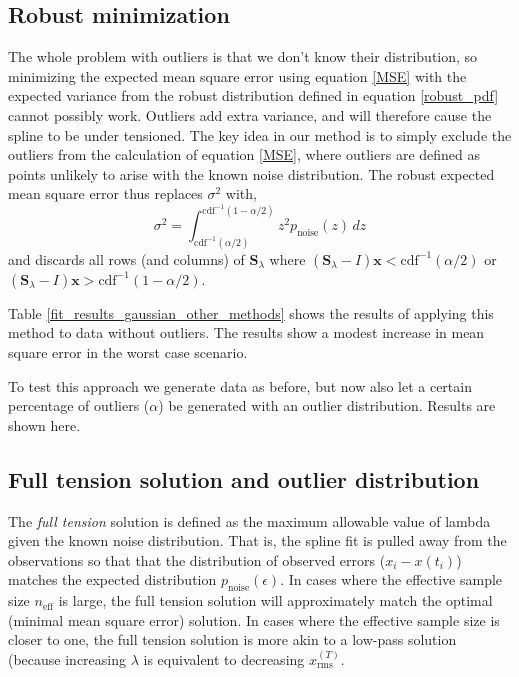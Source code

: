 \documentclass[10pt,journal]{IEEEtran}
\begin{document}
\subsection{Robust minimization}
\label{sec:robust_minimization}

The whole problem with outliers is that we don't know their distribution, so minimizing the expected mean square error using equation \ref{MSE} with the expected variance from the robust distribution defined in equation \ref{robust_pdf} cannot possibly work. Outliers add extra variance, and will therefore cause the spline to be under tensioned. The key idea in our method is to simply exclude the outliers from the calculation of equation \ref{MSE}, where outliers are defined as points unlikely to arise with the known noise distribution. The robust expected mean square error thus replaces $\sigma^2$ with,
\begin{equation}
    \sigma^2 = \int_{\textrm{cdf}^{-1}(\alpha/2)}^{\textrm{cdf}^{-1}(1-\alpha/2)} z^2 p_{\textrm{noise}}(z) \, dz
\end{equation}
and discards all rows (and columns) of $\mathbf{S}_\lambda$ where $\left(\mathbf{S}_\lambda - I\right)\mathbf{x}<\textrm{cdf}^{-1}(\alpha/2)$ or $\left(\mathbf{S}_\lambda - I\right)\mathbf{x}>\textrm{cdf}^{-1}(1-\alpha/2)$.

Table \ref{fit_results_gaussian_other_methods} shows the results of applying this method to data without outliers. The results show a modest increase in mean square error in the worst case scenario.

To test this approach we generate data as before, but now also let a certain percentage of outliers ($\alpha$) be generated with an outlier distribution. Results are shown here.

\subsection{Full tension solution and outlier distribution}
\label{sec:full_tension}

The \emph{full tension} solution is defined as the maximum allowable value of lambda given the known noise distribution. That is, the spline fit is pulled away from the observations so that that the distribution of observed errors ($x_i-x(t_i)$) matches the expected distribution $p_{\textrm{noise}}(\epsilon)$. In cases where the effective sample size $n_\textrm{eff}$ is large, the full tension solution will approximately match the optimal (minimal mean square error) solution. In cases where the effective sample size is closer to one, the full tension solution is more akin to a low-pass solution (because increasing $\lambda$ is equivalent to decreasing $x^{(T)}_\textrm{rms}$.
\end{document}
